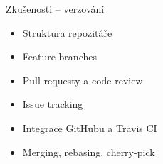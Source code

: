 \documentclass[10pt,xcolor=pdflatex,hyperref={unicode,hidelinks}]{beamer}
\begin{document}
\begin{frame}{Zkušenosti -- verzování}
    \begin{itemize}
        \item<only@1,4,6-> Struktura repozitáře
        \item<only@1,4,6-> Feature branches
        \item<only@1,4,6-> Pull requesty a code review
        \item<only@4,6-> Issue tracking
        \item<only@6-> Integrace GitHubu a Travis CI
        \item<only@6-> Merging, rebasing, cherry-pick
    \end{itemize}
    
    

\end{frame}
\end{document}
